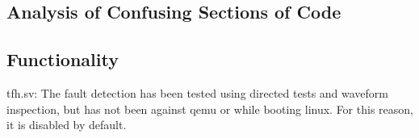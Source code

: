 \subsection{Analysis of Confusing Sections of Code}

\subsection{Functionality}
\label{sec:mmufunct}

\begin{list}
\item tfh.sv: 
The fault detection has been tested using directed tests and waveform inspection, but has not been against qemu or while booting linux.
For this reason, it is disabled by default.
\end{list}

